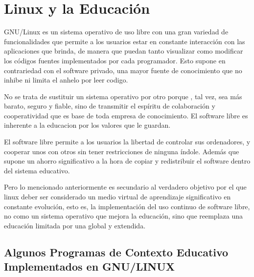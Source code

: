 \chapter*{Linux y la Educación}
GNU/Linux es un sistema operativo de uso libre con una gran
variedad de funcionalidades que permite a los usuarios estar en
constante interacción con las aplicaciones que brinda, de
manera que puedan tanto visualizar como modificar los códigos
fuentes implementados por cada programador. Esto supone en
contrariedad con el software privado, una mayor fuente de
conocimiento que no inhibe ni limita el anhelo por leer codigo.

No se trata de sustituir un sistema operativo por otro porque ,
tal vez, sea más barato, seguro y fiable, sino de transmitir el
espíritu de colaboración y cooperatividad que es base de toda
empresa de conocimiento. El software libre es inherente a la
educacion por los valores que le guardan.

El software libre permite a los usuarios la libertad de controlar
sus ordenadores, y cooperar unos con otros sin tener
restricciones de ninguna índole. Además que supone un ahorro
significativo a la hora de copiar y redistribuir el software dentro
del sistema educativo.

Pero lo mencionado anteriormente es secundario al verdadero
objetivo por el que linux deber ser considerado un medio virtual
de aprendizaje significativo en constante evolución, esto es, la
implementación del uso continuo de software libre, no como un
sistema operativo que mejora la educación, sino que reemplaza
una educación limitada por una global y extendida.


\section*{Algunos Programas de Contexto Educativo Implementados en GNU/LINUX}
